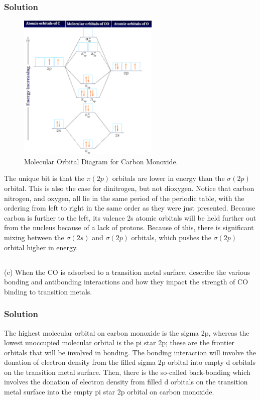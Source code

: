 \documentclass[12pt]{article}
\begin{document}
\subsubsection{Solution}
\begin{figure}[h]
    \centering
    \includegraphics[width=0.6\textwidth]{co_mo.png}
    \caption{Molecular Orbital Diagram for Carbon Monoxide.}
    \label{fig:CO_MO}
\end{figure}
The unique bit is that the $\pi(2p)$ orbitals are lower in energy than the $\sigma(2p)$ orbital. This is also the case for dinitrogen, but not dioxygen. Notice that carbon nitrogen, and oxygen, all lie in the same period of the periodic table, with the ordering from left to right in the same order as they were just presented. Because carbon is further to the left, its valence 2s atomic orbitals will be held further out from the nucleus because of a lack of protons. Because of this, there is significant mixing between the $\sigma (2s)$ and $\sigma(2p)$ orbitals, which pushes the $\sigma(2p)$ orbital higher in energy. 
\subsection{}
(c) When the CO is adsorbed to a transition metal surface, describe the various bonding and antibonding interactions and how they impact the strength of CO binding to transition metals.\\
\subsubsection{Solution}
The highest molecular orbital on carbon monoxide is the sigma 2p, whereas the lowest unoccupied molecular orbital is the pi star 2p; these are the frontier orbitals that will be involved in bonding. The bonding interaction will involve the donation of electron density from the filled sigma 2p orbital into empty d orbitals on the transition metal surface. Then, there is the so-called back-bonding which involves the donation of electron density from filled d orbitals on the transition metal surface into the empty pi star 2p orbital on carbon monoxide.
\end{document}
